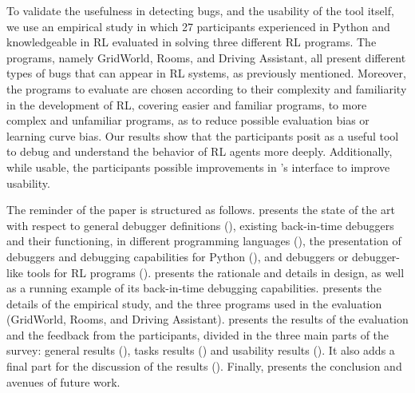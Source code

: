 To validate the usefulness in detecting bugs, and the usability of the tool itself, we use an empirical 
study in which 27 participants experienced in Python and knowledgeable in \ac{RL} evaluated \flik in 
solving three different \ac{RL} programs. The programs, namely GridWorld, Rooms, and Driving 
Assistant, all present different types of bugs that can appear in \ac{RL} systems, as previously 
mentioned. Moreover, the programs to evaluate are chosen according to their complexity and 
familiarity in the development of \ac{RL}, covering easier and familiar programs, to more complex and 
unfamiliar programs, as to reduce possible evaluation bias or learning curve bias.
Our results show that the participants posit \flik as a useful tool to debug and understand the behavior 
of \ac{RL} agents more deeply. Additionally, while usable, the participants possible improvements in 
\flik's interface to improve usability.

The reminder of the paper is structured as follows.  presents the state of the 
art with respect to general debugger definitions (), existing back-in-time debuggers and 
their functioning, in different programming languages (), the presentation of debuggers 
and debugging capabilities for Python (), and debuggers or debugger-like tools for \ac{RL} 
programs ().  presents the rationale and details in \flik design, as well as 
a running example of its back-in-time debugging capabilities.  presents the details 
of the empirical study, and the three programs used in the evaluation (\ie GridWorld, Rooms, and 
Driving Assistant).  presents the results of the evaluation and the feedback from the 
participants, divided in the 
three main parts of the survey: general results (), tasks 
results () and usability results (). It also adds 
a final part for the discussion of the results (). 
Finally,  presents the conclusion and avenues of future work.


\endinput

